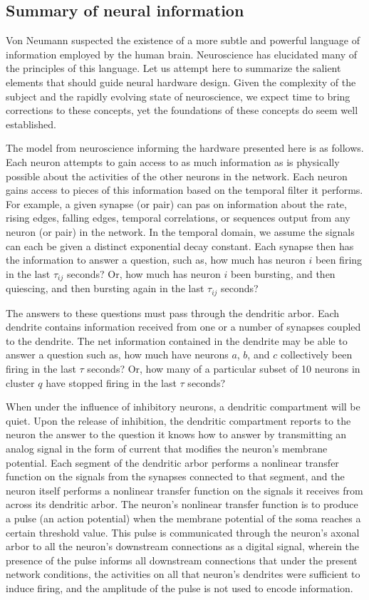 \subsection{Summary of neural information}
Von Neumann suspected the existence of a more subtle and powerful language of information employed by the human brain. Neuroscience has elucidated many of the principles of this language. Let us attempt here to summarize the salient elements that should guide neural hardware design. Given the complexity of the subject and the rapidly evolving state of neuroscience, we expect time to bring corrections to these concepts, yet the foundations of these concepts do seem well established.

The model from neuroscience informing the hardware presented here is as follows. Each neuron attempts to gain access to as much information as is physically possible about the activities of the other neurons in the network. Each neuron gains access to pieces of this information based on the temporal filter it performs. For example, a given synapse (or pair) can pas on information about the rate, rising edges, falling edges, temporal correlations, or sequences output from any neuron (or pair) in the network. In the temporal domain, we assume the signals can each be given a distinct exponential decay constant. Each synapse then has the information to answer a question, such as, how much has neuron $i$ been firing in the last $\tau_{ij}$ seconds? Or, how much has neuron $i$ been bursting, and then quiescing, and then bursting again in the last $\tau_{ij}$ seconds? 

The answers to these questions must pass through the dendritic arbor. Each dendrite contains information received from one or a number of synapses coupled to the dendrite. The net information contained in the dendrite may be able to answer a question such as, how much have neurons $a$, $b$, and $c$ collectively been firing in the last $\tau$ seconds? Or, how many of a particular subset of 10 neurons in cluster $q$ have stopped firing in the last $\tau$ seconds? 

When under the influence of inhibitory neurons, a dendritic compartment will be quiet. Upon the release of inhibition, the dendritic compartment reports to the neuron the answer to the question it knows how to answer by transmitting an analog signal in the form of current that modifies the neuron's membrane potential. Each segment of the dendritic arbor performs a nonlinear transfer function on the signals from the synapses connected to that segment, and the neuron itself performs a nonlinear transfer function on the signals it receives from across its dendritic arbor. The neuron's nonlinear transfer function is to produce a pulse (an action potential) when the membrane potential of the soma reaches a certain threshold value. This pulse is communicated through the neuron's axonal arbor to all the neuron's downstream connections as a digital signal, wherein the presence of the pulse informs all downstream connections that under the present network conditions, the activities on all that neuron's dendrites were sufficient to induce firing, and the amplitude of the pulse is not used to encode information.

